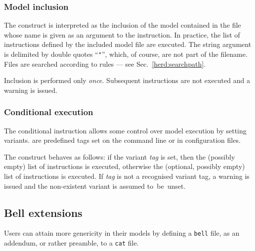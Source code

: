\subsubsection*{Model inclusion}
The construct  is interpreted as
the inclusion of the model contained in the file whose name is given as
an argument to the  instruction.
In practice, the list of instructions defined by the included model file
are executed.
The string argument is delimited by double quotes ``\verb+"+'',
which, of course, are not part of the filename.
Files are searched according to \herd{} rules --- see Sec.~\ref{herd:searchpath}.

Inclusion is performed only \emph{once}. Subsequent  instructions
are not executed and a warning is issued.

\subsubsection*{Conditional execution}
The conditional instruction allows some control over model execution by setting variants.
 are predefined tags set on the
command line or in configuration files.

The
construct 
behaves as follows: if the variant \textit{tag} is set, then the
(possibly empty) list of instructions  is
executed, otherwise the (optional, possibly empty) list of
instructions  is executed. If \textit{tag}
is not a recognised variant tag, a warning is issued and the
non-existent variant is assumed to~be~unset.


\subsection*{\label{sec:bell}Bell extensions}

Users can attain more genericity in their models by defining a {\tt bell} file,
as an addendum, or rather preamble, to a {\tt cat} file.

